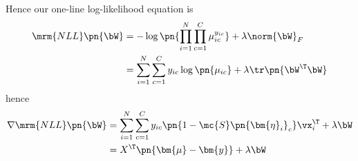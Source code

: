 \documentclass[189]{pset}
\begin{document}
\begin{enumerate}
        Hence our one-line log-likelihood equation is
        \begin{align*}
          \mrm{NLL}\pn{\bW}
          &= -\log \pn{\prod_{i=1}^N \prod_{c=1}^C \mu_{ic}^{y_{ic}}}
            + \lambda \norm{\bW}_F \\
          &= \sum_{i=1}^N \sum_{c=1}^C y_{ic} \log\pn{\mu_{ic}} +
            \lambda \tr\pn{\bW^\T \bW}
        \end{align*}
        hence
        \begin{align*}
          \nabla \mrm{NLL}\pn{\bW}
          &= \sum_{i=1}^N \sum_{c=1}^C y_{ic} \pn{1 -
            \mc{S}\pn{\bm{\eta}_i}_c} \vx_i^\T + \lambda \bW \\
          &= X^\T \pn{\bm{\mu} - \bm{y}} + \lambda \bW
        \end{align*}
    \end{enumerate}
\end{document}
